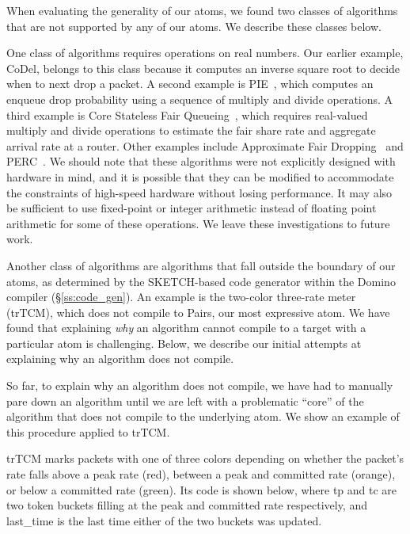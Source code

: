  When evaluating the
generality of our atoms, we found two classes of algorithms that are not
supported by any of our atoms. We describe these classes below.

One class of algorithms requires operations on real numbers.  Our earlier
example, CoDel, belongs to this class because it computes an inverse square
root to decide when to next drop a packet. A second example is PIE~\cite{pie},
which computes an enqueue drop probability using a sequence of multiply and
divide operations. A third example is Core Stateless Fair Queueing~\cite{csfq},
which requires real-valued multiply and divide operations to estimate the fair
share rate and aggregate arrival rate at a router. Other examples include
Approximate Fair Dropping~\cite{afd} and PERC~\cite{perc}. We should note that
these algorithms were not explicitly designed with hardware in mind, and it is
possible that they can be modified to accommodate the constraints of high-speed
hardware without losing performance.  It may also be sufficient to use
fixed-point or integer arithmetic instead of floating point arithmetic for some
of these operations. We leave these investigations to future work.

Another class of algorithms are algorithms that fall outside the boundary of
our atoms, as determined by the SKETCH-based code generator within the Domino
compiler (\S\ref{ss:code_gen}). An example is the two-color three-rate
meter~\cite{trTCM} (trTCM), which does not compile to Pairs, our most
expressive atom. We have found that explaining {\em why} an algorithm cannot
compile to a target with a particular atom is challenging.  Below, we describe
our initial attempts at explaining why an algorithm does not compile.

So far, to explain why an algorithm does not compile, we have had to manually
pare down an algorithm until we are left with a problematic ``core'' of the
algorithm that does not compile to the underlying atom. We show an example of
this procedure applied to trTCM.

trTCM marks packets with one of three colors depending on whether the packet's
rate falls above a peak rate (red), between a peak and committed rate (orange),
or below a committed rate (green). Its code is shown below, where tp and tc are
two token buckets filling at the peak and committed rate respectively, and
last\_time is the last time either of the two buckets was updated.

